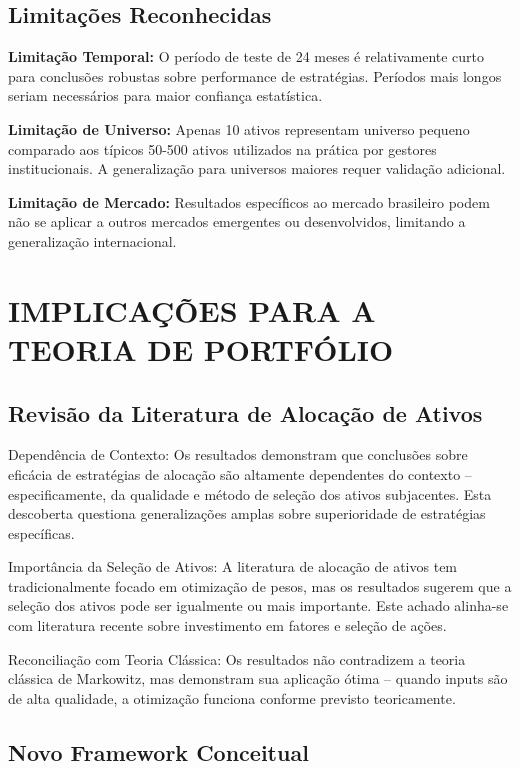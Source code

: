\subsection{Limitações Reconhecidas}

\textbf{Limitação Temporal:} O período de teste de 24 meses é relativamente curto para conclusões robustas sobre performance de estratégias. Períodos mais longos seriam necessários para maior confiança estatística.

\textbf{Limitação de Universo:} Apenas 10 ativos representam universo pequeno comparado aos típicos 50-500 ativos utilizados na prática por gestores institucionais. A generalização para universos maiores requer validação adicional.

\textbf{Limitação de Mercado:} Resultados específicos ao mercado brasileiro podem não se aplicar a outros mercados emergentes ou desenvolvidos, limitando a generalização internacional.

\section{IMPLICAÇÕES PARA A TEORIA DE PORTFÓLIO}

\subsection{Revisão da Literatura de Alocação de Ativos}

Dependência de Contexto: Os resultados demonstram que conclusões sobre eficácia de estratégias de alocação são altamente dependentes do contexto – especificamente, da qualidade e método de seleção dos ativos subjacentes. Esta descoberta questiona generalizações amplas sobre superioridade de estratégias específicas.

Importância da Seleção de Ativos: A literatura de alocação de ativos tem tradicionalmente focado em otimização de pesos, mas os resultados sugerem que a seleção dos ativos pode ser igualmente ou mais importante. Este achado alinha-se com literatura recente sobre investimento em fatores e seleção de ações.

Reconciliação com Teoria Clássica: Os resultados não contradizem a teoria clássica de Markowitz, mas demonstram sua aplicação ótima – quando inputs são de alta qualidade, a otimização funciona conforme previsto teoricamente.

\subsection{Novo Framework Conceitual}

